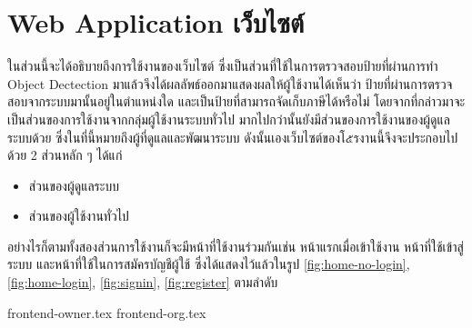 \clearpage
\section{\ifenglish Web Application \else เว็บไซต์ \fi}
\ifenglish * \else
ในส่วนนี้จะได้อธิบายถึงการใช้งานของเว็บไซต์ ซึ่งเป็นส่วนที่ใช้ในการตรวจสอบป้ายที่ผ่านการทำ Object Dectection มาแล้วจึงได้ผลลัพธ์ออกมาแสดงผลให้ผู้ใช้งานได้เห็นว่า ป้ายที่ผ่านการตรวจสอบจากระบบมานั้นอยู่ในตำแหน่งใด
และเป็นป้ายที่สามารถจัดเก็บภาษีได้หรือไม่ โดยจากที่กล่าวมาจะเป็นส่วนของการใช้งานจากกลุ่มผู้ใช้งานระบบทั่วไป มากไปกว่านั้นยังมีส่วนของการใช้งานของผู้ดูแลระบบด้วย ซึ่งในที่นี้หมายถึงผู้ที่ดูแลและพัฒนาระบบ ดังนั้นเองเว็บไซต์ของโ๕รงานนี้จึงจะประกอบไปด้วย 2 ส่วนหลัก ๆ ได้แก่
\begin{itemize}
    \item ส่วนของผู้ดูแลระบบ
    \item ส่วนของผู้ใช้งานทั่วไป
\end{itemize}
\fi

อย่างไรก็ตามทั้งสองส่วนการใช้งานก็จะมีหน้าที่ใช้งานร่วมกันเช่น หน้าแรกเมื่อเข้าใช้งาน หน้าที่ใช้เข้าสู่ระบบ และหน้าที่ใช้ในการสมัครบัญชีผู้ใช้ ซึ่งได้แสดงไว้แล้วในรูป
\ref{fig:home-no-login}, \ref{fig:home-login}, \ref{fig:signin}, \ref{fig:register} ตามลำดับ



\clearpage

{frontend-owner.tex}
{frontend-org.tex}